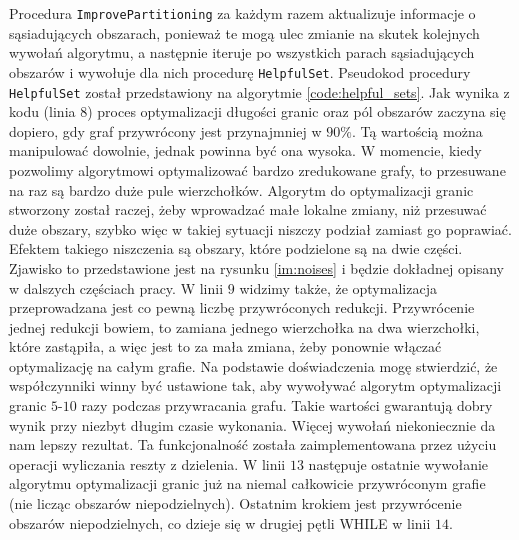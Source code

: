 Procedura \texttt{ImprovePartitioning} za każdym razem aktualizuje informacje o sąsiadujących obszarach, ponieważ
te mogą ulec zmianie na skutek kolejnych wywołań algorytmu, a następnie iteruje po wszystkich parach sąsiadujących obszarów i wywołuje
dla nich procedurę \texttt{HelpfulSet}.
Pseudokod procedury \texttt{HelpfulSet} został przedstawiony na algorytmie \ref{code:helpful_sets}.
Jak wynika z kodu (linia $8$) proces optymalizacji długości granic oraz pól obszarów zaczyna się dopiero,
gdy graf przywrócony jest przynajmniej w $90\%$.
Tą wartością można manipulować dowolnie, jednak powinna być ona wysoka.
W momencie, kiedy pozwolimy algorytmowi optymalizować bardzo zredukowane grafy, to przesuwane na raz są bardzo duże pule wierzchołków.
Algorytm do optymalizacji granic stworzony został raczej, żeby wprowadzać małe lokalne zmiany, niż przesuwać duże obszary,
szybko więc w takiej sytuacji niszczy podział zamiast go poprawiać.
Efektem takiego niszczenia są obszary, które podzielone są na dwie części.
Zjawisko to przedstawione jest na rysunku \ref{im:noises} i będzie dokładnej opisany w dalszych częściach pracy.
W linii $9$ widzimy także, że optymalizacja przeprowadzana jest co pewną liczbę przywróconych redukcji.
Przywrócenie jednej redukcji bowiem, to zamiana jednego wierzchołka na dwa wierzchołki, które zastąpiła, a więc
jest to za mała zmiana, żeby ponownie włączać optymalizację na całym grafie.
Na podstawie doświadczenia mogę stwierdzić, że współczynniki winny być ustawione tak, aby wywoływać
algorytm optymalizacji granic $5$-$10$ razy podczas przywracania grafu.
Takie wartości gwarantują dobry wynik przy niezbyt długim czasie wykonania.
Więcej wywołań niekoniecznie da nam lepszy rezultat.
Ta funkcjonalność została zaimplementowana przez użyciu operacji wyliczania reszty z dzielenia.
W linii $13$ następuje ostatnie wywołanie algorytmu optymalizacji granic już na niemal całkowicie przywróconym grafie
(nie licząc obszarów niepodzielnych).
Ostatnim krokiem jest przywrócenie obszarów niepodzielnych, co dzieje się w drugiej pętli WHILE
w linii $14$.